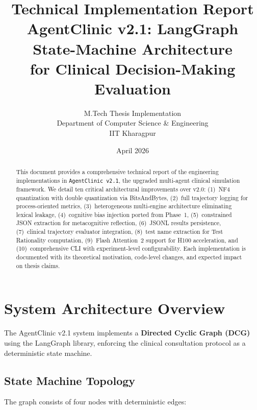 \documentclass[12pt, a4paper]{article}
\title{
    \textbf{Technical Implementation Report} \\[0.5em]
    \Large AgentClinic v2.1: LangGraph State-Machine Architecture \\
    for Clinical Decision-Making Evaluation
}
\author{
    M.Tech Thesis Implementation \\
    Department of Computer Science \& Engineering \\
    IIT Kharagpur
}
\date{April 2026}
\begin{document}
\maketitle

\begin{abstract}
This document provides a comprehensive technical report of the engineering
implementations in \texttt{AgentClinic v2.1}, the upgraded multi-agent clinical
simulation framework. We detail ten critical architectural improvements over
v2.0: (1)~NF4 quantization with double quantization via BitsAndBytes,
(2)~full trajectory logging for process-oriented metrics,
(3)~heterogeneous multi-engine architecture eliminating lexical leakage,
(4)~cognitive bias injection ported from Phase~1,
(5)~constrained JSON extraction for metacognitive reflection,
(6)~JSONL results persistence,
(7)~clinical trajectory evaluator integration,
(8)~test name extraction for Test Rationality computation,
(9)~Flash Attention~2 support for H100 acceleration, and
(10)~comprehensive CLI with experiment-level configurability.
Each implementation is documented with its theoretical motivation,
code-level changes, and expected impact on thesis claims.
\end{abstract}

\tableofcontents
\newpage

\section{System Architecture Overview}

The AgentClinic v2.1 system implements a \textbf{Directed Cyclic Graph (DCG)}
using the LangGraph library, enforcing the clinical consultation protocol as
a deterministic state machine.

\subsection{State Machine Topology}

The graph consists of four nodes with deterministic edges:
\end{document}
